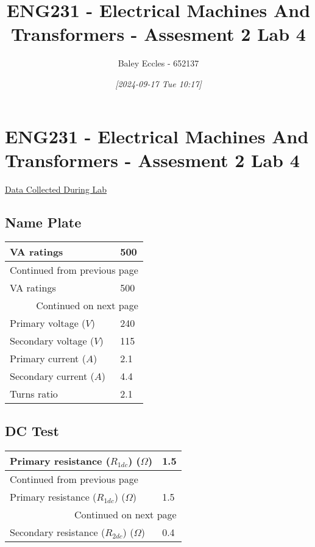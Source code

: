 \documentclass[11pt]{article}
\author{Baley Eccles - 652137}
\date{\textit{{[}2024-09-17 Tue 10:17]}}
\title{ENG231 - Electrical Machines And Transformers - Assesment 2 Lab 4}
\begin{document}
\maketitle
\tableofcontents

\section{ENG231 - Electrical Machines And Transformers - Assesment 2 Lab 4}
\label{sec:org768bc2f}
\href{file:///home/Baley/UTAS/ENG231 - Electrical Machines And Transformers/Lab 4/Data.ods}{Data Collected During Lab}
\subsection{Name Plate}
\label{sec:orgcaee541}
\begin{longtable}{|l|l|}
\hline
VA ratings & 500\\
\hline
\endfirsthead
\multicolumn{2}{l}{Continued from previous page} \\
\hline

VA ratings & 500 \\

\hline
\endhead
\hline\multicolumn{2}{r}{Continued on next page} \\
\endfoot
\endlastfoot
\hline
Primary voltage (\(V\)) & 240\\
\hline
Secondary voltage (\(V\)) & 115\\
\hline
Primary current (\(A\)) & 2.1\\
\hline
Secondary current (\(A\)) & 4.4\\
\hline
Turns ratio & 2.1\\
\hline
\end{longtable}
\subsection{DC Test}
\label{sec:orgf246c0b}
\begin{longtable}{|l|l|}
\hline
Primary resistance (\(R_{1dc}\)) (\(\Omega\)) & 1.5\\
\hline
\endfirsthead
\multicolumn{2}{l}{Continued from previous page} \\
\hline

Primary resistance (\(R_{1dc}\)) (\(\Omega\)) & 1.5 \\

\hline
\endhead
\hline\multicolumn{2}{r}{Continued on next page} \\
\endfoot
\endlastfoot
\hline
Secondary resistance (\(R_{2dc}\)) (\(\Omega\)) & 0.4\\
\hline
\end{longtable}
\end{document}
